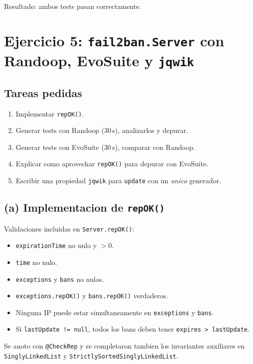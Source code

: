 \documentclass[12pt,a4paper]{article}
\begin{document}
Resultado: ambos tests pasan correctamente.

\section{Ejercicio 5: \texttt{fail2ban.Server} con Randoop, EvoSuite y \texttt{jqwik}}

\subsection{Tareas pedidas}

\begin{enumerate}
  \item Implementar \texttt{repOK()}.
  \item Generar tests con Randoop ($30$\,s), analizarlos y depurar.
  \item Generar tests con EvoSuite ($30$\,s), comparar con Randoop.
  \item Explicar como aprovechar \texttt{repOK()} para depurar con EvoSuite.
  \item Escribir una propiedad \texttt{jqwik} para \texttt{update} con un \emph{unico}
  generador.
\end{enumerate}

\subsection{(a) Implementacion de \texttt{repOK()}}

Validaciones incluidas en \texttt{Server.repOK()}:

\begin{itemize}
  \item \texttt{expirationTime} no nulo y $> 0$.
  \item \texttt{time} no nulo.
  \item \texttt{exceptions} y \texttt{bans} no nulos.
  \item \texttt{exceptions.repOK()} y \texttt{bans.repOK()} verdaderos.
  \item Ninguna IP puede estar simultaneamente en \texttt{exceptions} y \texttt{bans}.
  \item Si \texttt{lastUpdate != null}, todos los bans deben tener
  \texttt{expires > lastUpdate}.
\end{itemize}

Se anoto con \texttt{@CheckRep} y se completaron tambien los invariantes auxiliares en
\texttt{SinglyLinkedList} y \texttt{StrictlySortedSinglyLinkedList}.
\end{document}
